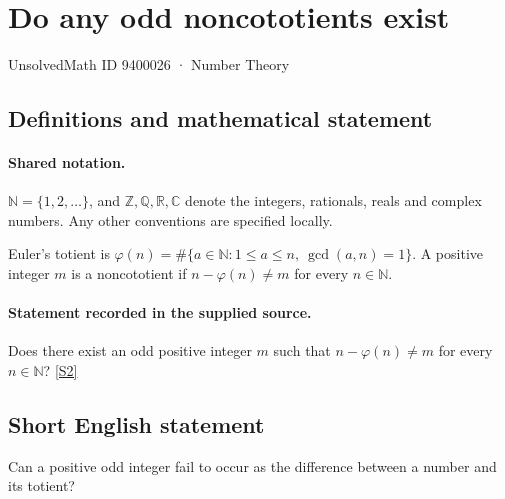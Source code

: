 \documentclass[11pt]{article}
\newcommand{\sref}[2]{\hyperlink{source:#1:#2}{[S#2]}}
\begin{document}
\setcounter{section}{9400025}
\section{Do any odd noncototients exist}\label{9400026}
{\small\sffamily UnsolvedMath ID 9400026 · Number Theory}
\subsection{Definitions and mathematical statement}

\paragraph{Shared notation.}$\mathbb N=\{1,2,\ldots\}$, and $\mathbb Z,\mathbb Q,\mathbb R,\mathbb C$ denote the integers, rationals, reals and complex numbers. Any other conventions are specified locally.


Euler's totient is $\varphi(n)=\#\{a\in\mathbb N:1\le a\le n,\ \gcd(a,n)=1\}$. A positive integer $m$ is a noncototient if $n-\varphi(n)\ne m$ for every $n\in\mathbb N$.
\paragraph{Statement recorded in the supplied source.}
Does there exist an odd positive integer $m$ such that $n-\varphi(n)\ne m$ for every $n\in\mathbb N$? \sref{9400026}{2}
\subsection{Short English statement}
Can a positive odd integer fail to occur as the difference between a number and its totient?
\end{document}
